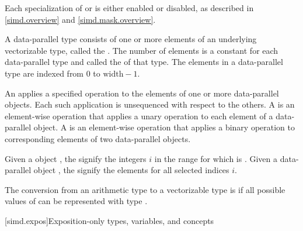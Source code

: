 \pnum
Each specialization of  or  is either
enabled or disabled, as described in \ref{simd.overview} and
\ref{simd.mask.overview}.

\pnum
A data-parallel type consists of one or more elements of an underlying
vectorizable type, called the .
The number of elements is a constant for each data-parallel type and called the
 of that type.
The elements in a data-parallel type are indexed from 0 to $\textrm{width} - 1$.

\pnum
An  applies a specified operation to the
elements of one or more data-parallel objects.
Each such application is unsequenced with respect to the others.
A  is an element-wise operation that
applies a unary operation to each element of a data-parallel object.
A  is an element-wise operation that
applies a binary operation to corresponding elements of two data-parallel
objects.

\pnum
Given a  object , the
 signify the integers $i$ in the range
 for which  is .
Given a data-parallel object , the 
signify the elements  for all selected indices $i$.

\pnum
The conversion from an arithmetic type  to a vectorizable type
 is  if all possible values of  can be
represented with type .

[simd.expos]{Exposition-only types, variables, and concepts}

